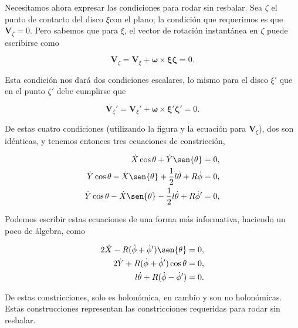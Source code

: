 \documentclass[a4paper,10pt]{article}
\numberwithin{equation}{section}
\begin{document}
Necesitamos ahora expresar las condiciones para rodar sin resbalar. Sea 
$\zeta$ el punto de contacto del disco $\xi$con el plano; la condición que 
requerimos es que $\mathbf{V}_\zeta = 0$. Pero sabemos que para $\xi$, 
el vector de rotación instantánea en $\zeta$ puede escribirse como 

\begin{equation}
 \mathbf{V}_\zeta = \mathbf{V}_\xi + \mathbf{\omega}\times \mathbf{\xi\zeta} = 0.
\end{equation}

Esta condición nos dará dos condiciones escalares, lo mismo para 
el disco $\xi'$ que en el punto $\zeta'$ debe cumplirse que 

\begin{equation}
 \mathbf{V}_\zeta' = \mathbf{V}_\xi' + \mathbf{\omega}\times \mathbf{\xi'\zeta'} = 0.
\end{equation}

De estas cuatro condiciones (utilizando la figura  y la ecuación para $\mathbf{V}_\xi$), 
dos son idénticas, y tenemos entonces tres ecuaciones de constricción,

\begin{align}
\label{eq:discosConstri01}
 \dot{X}\cos{\theta} + \dot{Y}\sen{\theta} = 0, \\
\label{eq:discosConstri02}
 \dot{Y}\cos{\theta} - \dot{X}\sen{\theta} + \frac{1}{2}l\dot{\theta} + R\dot{\phi} = 0, \\
\label{eq:discosConstri03}
 \dot{Y}\cos{\theta} - \dot{X}\sen{\theta} - \frac{1}{2}l\dot{\theta} + R\dot{\phi}' = 0,
\end{align}

Podemos escribir estas ecuaciones de una forma más informativa, haciendo 
un poco de álgebra, como

\begin{align}
\label{eq:discosConstri1}
 2\dot{X} - R (\dot{\phi} + \dot{\phi}')\sen{\theta} = 0, \\
\label{eq:discosConstri2}
 2\dot{Y} + R (\dot{\phi} + \dot{\phi}')\cos{\theta} = 0, \\
\label{eq:discosConstri3}
 l\dot{\theta} + R (\dot{\phi} - \dot{\phi}') = 0.
\end{align}

De estas constricciones, solo  es holonómica, 
en cambio  y  son no holonómicas. 
Estas construcciones representan las constricciones requeridas para rodar 
sin resbalar. 
\end{document}
